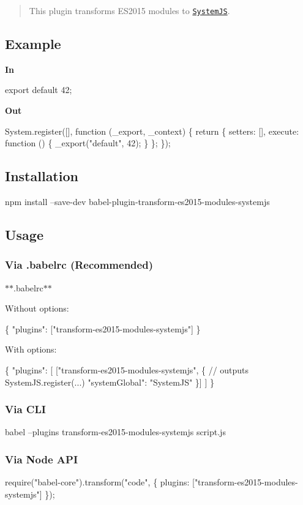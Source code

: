 \begin{quote}
This plugin transforms E\+S2015 modules to \href{https://github.com/systemjs/systemjs}{\tt System\+JS}. \end{quote}


\subsection*{Example}

{\bfseries In}


\begin{DoxyCode}
export default 42;
\end{DoxyCode}


{\bfseries Out}


\begin{DoxyCode}
System.register([], function (\_export, \_context) \{
  return \{
    setters: [],
    execute: function () \{
      \_export("default", 42);
    \}
  \};
\});
\end{DoxyCode}


\subsection*{Installation}


\begin{DoxyCode}
npm install --save-dev babel-plugin-transform-es2015-modules-systemjs
\end{DoxyCode}


\subsection*{Usage}

\subsubsection*{Via {\ttfamily .babelrc} (Recommended)}

$\ast$$\ast$.babelrc$\ast$$\ast$

Without options\+:


\begin{DoxyCode}
\{
  "plugins": ["transform-es2015-modules-systemjs"]
\}
\end{DoxyCode}


With options\+:


\begin{DoxyCode}
\{
  "plugins": [
    ["transform-es2015-modules-systemjs", \{
      // outputs SystemJS.register(...)
      "systemGlobal": "SystemJS"
    \}]
  ]
\}
\end{DoxyCode}


\subsubsection*{Via C\+LI}


\begin{DoxyCode}
babel --plugins transform-es2015-modules-systemjs script.js
\end{DoxyCode}


\subsubsection*{Via Node A\+PI}


\begin{DoxyCode}
require("babel-core").transform("code", \{
  plugins: ["transform-es2015-modules-systemjs"]
\});
\end{DoxyCode}
 